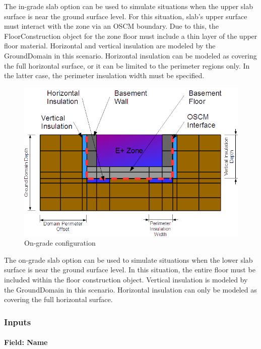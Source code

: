 The in-grade slab option can be used to simulate situations when the upper slab surface is near the ground surface level. For this situation, slab's upper surface must interact with the zone via an OSCM boundary. Due to this, the FloorConstruction object for the zone floor must include a thin layer of the upper floor material. Horizontal and vertical insulation are modeled by the GroundDomain in this scenario. Horizontal insulation can be modeled as covering the full horizontal surface, or it can be limited to the perimeter regions only. In the latter case, the perimeter insulation width must be specified.

\begin{figure}[htbp]
\centering
\includegraphics{media/image013.png}
\caption{On-grade configuration \protect \label{fig:on-grade-configuration}}
\end{figure}

The on-grade slab option can be used to simulate situations when the lower slab surface is near the ground surface level. In this situation, the entire floor must be included within the floor construction object. Vertical insulation is modeled by the GroundDomain in this scenario. Horizontal insulation can only be modeled as covering the full horizontal surface.

\subsubsection{Inputs}\label{inputs-16-006}

\paragraph{Field: Name}\label{field-name-8-009}

